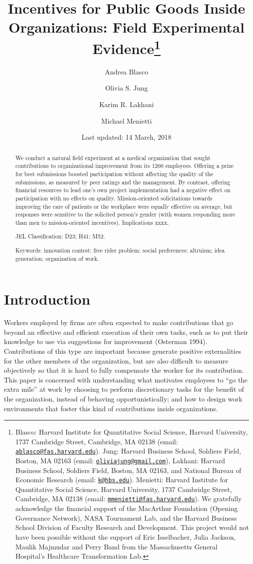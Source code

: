 \documentclass[11pt, titlepage]{article}
\title{Incentives for Public Goods Inside Organizations: Field Experimental
Evidence\thanks{Blasco: Harvard Institute for Quantitative Social Science, Harvard
University, 1737 Cambridge Street, Cambridge, MA 02138 (email:
\href{mailto:ablasco@fas.harvard.edu}{\nolinkurl{ablasco@fas.harvard.edu}}).
Jung: Harvard Business School, Soldiers Field, Boston, MA 02163 (email:
\href{mailto:oliviajung@gmail.com}{\nolinkurl{oliviajung@gmail.com}}),
Lakhani: Harvard Business School, Soldiers Field, Boston, MA 02163, and
National Bureau of Economic Research (email:
\href{mailto:k@hbs.edu}{\nolinkurl{k@hbs.edu}}). Menietti: Harvard
Institute for Quantitative Social Science, Harvard University, 1737
Cambridge Street, Cambridge, MA 02138 (email:
\href{mailto:mmenietti@fas.harvard.edu}{\nolinkurl{mmenietti@fas.harvard.edu}}).
We gratefully acknowledge the financial support of the MacArthur
Foundation (Opening Governance Network), NASA Tournament Lab, and the
Harvard Business School Division of Faculty Research and Development.
This project would not have been possible without the support of Eric
Isselbacher, Julia Jackson, Maulik Majmudar and Perry Band from the
Massachusetts General Hospital's Healthcare Transformation Lab.}}
\author{Andrea Blasco \and Olivia S. Jung \and Karim R. Lakhani \and Michael Menietti}
\date{Last updated: 14 March, 2018}
\begin{document}
\maketitle
\begin{abstract}
We conduct a natural field experiment at a medical organization that
sought contributions to organizational improvement from its 1200
employees. Offering a prize for best submissions boosted participation
without affecting the quality of the submissions, as measured by peer
ratings and the management. By contrast, offering financial resources to
lead one's own project implementation had a negative effect on
participation with no effects on quality. Mission-oriented solicitations
towards improving the care of patients or the workplace were equally
effective on average, but responses were sensitive to the solicited
person's gender (with women responding more than men to mission-oriented
incentives). Implications xxxx.

\smallskip\noindent 
JEL Classification: D23; H41; M52.

\smallskip\noindent 
Keywords: innovation contest; free rider problem; social preferences; altruism; idea generation; organization of work.
\end{abstract}


\clearpage
\tableofcontents
\setcounter{tocdepth}{2}
\clearpage

\section{Introduction}\label{introduction}

Workers employed by firms are often expected to make contributions that
go beyond an effective and efficient execution of their own tasks, such
as to put their knowledge to use via suggestions for improvement
(Osterman 1994). Contributions of this type are important because
generate positive externalities for the other members of the
organization, but are also difficult to measure objectively so that it
is hard to fully compensate the worker for its contribution. This paper
is concerned with understanding what motivates employees to ``go the
extra mile'' at work by choosing to perform discretionary tasks for the
benefit of the organization, instead of behaving opportunistically; and
how to design work environments that foster this kind of contributions
inside organizations.
\end{document}
